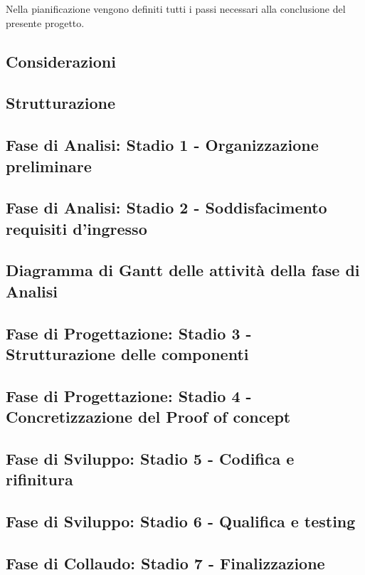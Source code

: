 Nella pianificazione vengono definiti tutti i passi necessari alla conclusione del presente progetto.

\subsection{Considerazioni}\label{sec:Considerazioni}


\subsection{Strutturazione}\label{sec:Strutturazione}


\subsection{Fase di Analisi: Stadio 1 - Organizzazione preliminare}\label{sec:Stadio1}


\subsection{Fase di Analisi: Stadio 2 - Soddisfacimento requisiti d'ingresso}\label{sec:Stadio2}


\newpage
\subsection{Diagramma di Gantt delle attività della fase di Analisi}\label{sec:Stadio2}

    
\subsection{Fase di Progettazione: Stadio 3 - Strutturazione delle componenti}\label{sec:Stadio3}

    
\subsection{Fase di Progettazione: Stadio 4 - Concretizzazione del Proof of concept}\label{sec:Stadio4}

    
\subsection{Fase di Sviluppo: Stadio 5 - Codifica e rifinitura }\label{sec:Stadio5}

    
\subsection{Fase di Sviluppo: Stadio 6 - Qualifica e testing}\label{sec:Stadio6}

    
\subsection{Fase di Collaudo: Stadio 7 - Finalizzazione}\label{sec:Stadio7}
